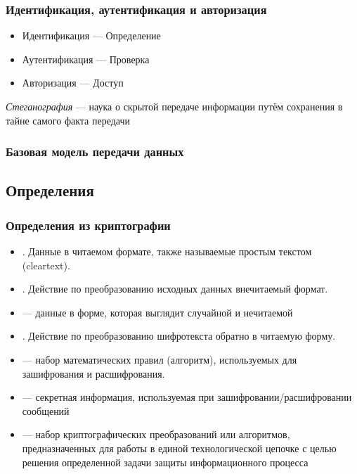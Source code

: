 \documentclass[a4paper, 14pt]{extarticle}
\begin{document}
\subsubsection*{Идентификация, аутентификация и авторизация}
\begin{itemize}
    \item Идентификация --- Определение 
    \item Аутентификация --- Проверка
    \item Авторизация --- Доступ
\end{itemize}

\textit{Стеганография} --- наука о скрытой передаче информации путём сохранения в тайне самого факта передачи 

\subsubsection*{Базовая модель передачи данных}

\FloatBarrier{} %
\subsection{Определения}
\subsubsection*{Определения из криптографии}
\begin{itemize}
    \item {}. Данные в читаемом формате, также называемые простым текстом (cleartext).
    \item {}. Действие по преобразованию исходных данных внечитаемый формат.
    \item {} --- данные в форме, которая выглядит случайной и нечитаемой
    \item {}. Действие по преобразованию шифротекста обратно в читаемую форму.
    \item {} --- набор математических правил (алгоритм), используемых для зашифрования и расшифрования.
    \item {} --- секретная информация, используемая при зашифровании/расшифровании сообщений
    \item {} --- набор криптографических преобразований или алгоритмов, предназначенных для работы в единой технологической цепочке с целью решения определенной задачи защиты информационного процесса
\end{itemize}
\end{document}
